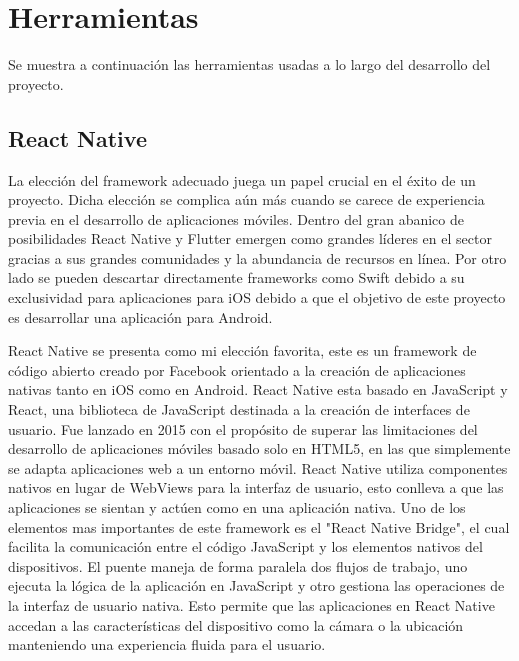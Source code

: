

\section{Herramientas}

Se muestra a continuación las herramientas usadas a lo largo del desarrollo del proyecto.

\subsection{React Native}

La elección del framework adecuado juega un papel crucial en el éxito de un proyecto. Dicha elección se complica aún más cuando se carece de experiencia previa en el desarrollo de aplicaciones móviles. Dentro del gran abanico de posibilidades React Native y Flutter emergen como grandes líderes en el sector gracias a sus grandes comunidades y la abundancia de recursos en línea. Por otro lado se pueden descartar directamente frameworks como Swift debido a su exclusividad para aplicaciones para iOS debido a que el objetivo de este proyecto es desarrollar una aplicación para Android.

React Native se presenta como mi elección favorita, este es un framework de código abierto creado por Facebook orientado a la creación de aplicaciones nativas tanto en iOS como en Android. React Native esta basado en JavaScript y React, una biblioteca de JavaScript destinada a la creación de interfaces de usuario. Fue lanzado en 2015 con el propósito de superar las limitaciones del desarrollo de aplicaciones móviles basado solo en HTML5, en las que simplemente se adapta aplicaciones web a un entorno móvil. React Native utiliza componentes nativos en lugar de WebViews para la interfaz de usuario, esto conlleva a que las aplicaciones se sientan y actúen como en una aplicación nativa. Uno de los elementos mas importantes de este framework es el "React Native Bridge", el cual facilita la comunicación entre el código JavaScript y los elementos nativos del dispositivos. El puente maneja de forma paralela dos flujos de trabajo, uno ejecuta la lógica de la aplicación en JavaScript y otro gestiona las operaciones de la interfaz de usuario nativa. Esto permite que las aplicaciones en React Native accedan a las características del dispositivo como la cámara o la ubicación manteniendo una experiencia fluida para el usuario. 


